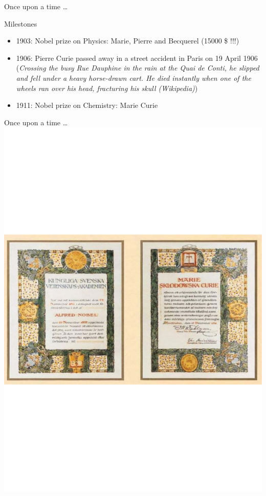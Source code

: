 \begin{frame}{Once upon a time \ldots}

\begin{exampleblock}{Milestones}

\begin{itemize}
\item 1903: Nobel prize on Physics: Marie, Pierre and Becquerel (15000 \$ !!!)
\item 1906: Pierre Curie passed away in a street accident in Paris on 19 April 1906 ({\footnotesize\textit{Crossing the busy Rue Dauphine in the rain at the Quai de Conti, he slipped and fell under a heavy horse-drawn cart. He died instantly when one of the wheels ran over his head, fracturing his skull (\emph{Wikipedia})}})
\item 1911: Nobel prize on Chemistry: Marie Curie
\end{itemize}

\end{exampleblock}

\end{frame}

\begin{frame}{Once upon a time \ldots}
\vskip-3.5cm
\centering
\includegraphics[scale=0.5]{figures/20160216_rsw_picnobel.pdf}
\end{frame}

